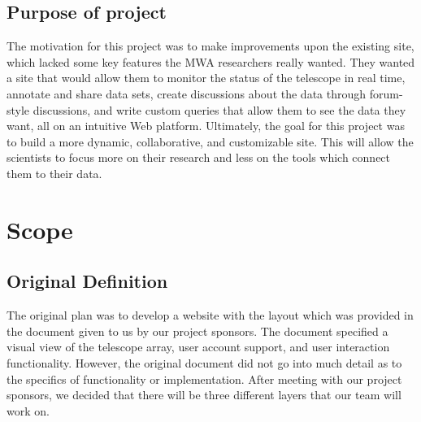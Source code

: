 \documentclass[12pt]{article}
\begin{document}
\begin{spacing}{1.5}
\subsection{Purpose of project}
The motivation for this project was to make improvements upon the existing site, which lacked some key features the MWA researchers really wanted. They wanted a site that would allow them to monitor the status of the telescope in real time, annotate and share data sets, create discussions about the data through forum-style discussions, and write custom queries that allow them to see the data they want, all on an intuitive Web platform. Ultimately, the goal for this project was to build a more dynamic, collaborative, and customizable site. This will allow the scientists to focus more on their research and less on the tools which connect them to their data.

\section{Scope}
\subsection{Original Definition}
The original plan was to develop a website with the layout which was provided in the document given to us by our project sponsors. The document specified a visual view of the telescope array, user account support, and user interaction functionality. However, the original document did not go into much detail as to the specifics of functionality or implementation. After meeting with our project sponsors, we decided that there will be three different layers that our team will work on.


\end{spacing}
\end{document}
